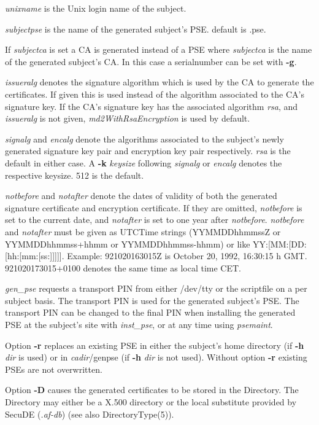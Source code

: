 {\em unixname} is the Unix login name of the subject.

{\em subjectpse} is the name of the generated subject's PSE. default is .pse.

If {\em subjectca} is set a CA is generated instead of a PSE where {\em subjectca}
is the name of the generated subject's CA.
In this case a serialnumber can be set with {\bf -g}.

{\em issueralg} denotes the signature algorithm  which is used by the CA to generate
the certificates. If given this is used instead of the algorithm associated to
the CA's signature key. If the CA's signature key has the associated algorithm {\em rsa},
and {\em issueralg} is not given, {\em md2WithRsaEncryption} is used by default.

{\em signalg} and {\em encalg} denote the algorithms associated to the subject's newly
generated signature key pair and encryption key pair respectively. {\em rsa} is the
default in either case. A {\bf -k} {\em keysize} following {\em signalg} or {\em encalg}
denotes the respective keysize. 512 is the default.

{\em notbefore} and {\em notafter} denote the dates of validity of both the generated
signature certificate and encryption certificate. If they are omitted, {\em notbefore} is
set to the current date, and {\em notafter} is set to one year after {\em notbefore}.
{\em notbefore} and {\em notafter} must be given as UTCTime strings (YYMMDDhhmmssZ
or YYMMDDhhmmss+hhmm or YYMMDDhhmmss-hhmm) or like YY:[MM:[DD:[hh:[mm:[ss:]]]]]. 
Example: 921020163015Z is October 20, 1992,
16:30:15 h GMT. 921020173015+0100 denotes the same time as local time CET.

{\em gen\_pse} requests a transport PIN from either /dev/tty or the scriptfile on a 
per subject basis. The transport PIN is used for the generated subject's PSE. The transport
PIN can be changed to the final PIN when installing the generated PSE at the subject's
site with {\em inst\_pse}, or at any time using {\em psemaint}.

Option {\bf -r} replaces an existing PSE in either the subject's home directory (if {\bf -h}
{\em dir} is used) or in {\em cadir}/genpse  (if {\bf -h} {\em dir} is not used). Without
option {\bf -r} existing PSEs are not overwritten.

Option {\bf -D} causes the generated certificates to be stored in the Directory.
The Directory may either be a X.500 directory or the local substitute provided by 
SecuDE ({\em .af-db}) (see also DirectoryType(5)).

